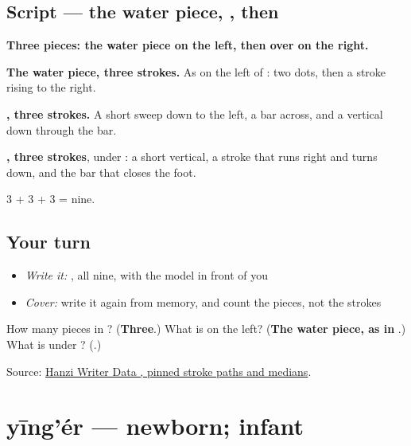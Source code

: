 \subsection*{Script — the water piece, , then }

\begin{quote}
\end{quote}

\textbf{Three pieces: the water piece on the left, then  over  on the right.}

\textbf{The water piece, three strokes.} As on the left of : two dots, then a stroke rising to the right.

\textbf{, three strokes.} A short sweep down to the left, a bar across, and a vertical down through the bar.

\textbf{, three strokes}, under : a short vertical, a stroke that runs right and turns down, and the bar that closes the foot.

3 + 3 + 3 = nine.

\subsection*{Your turn}
\begin{itemize}
\raggedright
  \item \emph{Write it:} , all nine, with the model in front of you
  \item \emph{Cover:} write it again from memory, and count the pieces, not the strokes
\end{itemize}

\begin{tcolorbox}[breakable,colback=teal!4,colframe=teal!35!black,title={Before you move on}]
How many pieces in ? (\textbf{Three}.) What is on the left? (\textbf{The water piece, as in }.) What is under ? (\textbf{}.)

Source: \href{https://raw.githubusercontent.com/chanind/hanzi-writer-data/68d10a4b21150cae5e1ebbd223eed289cf32d90c/data/\%E6\%B4\%BB.json}{Hanzi Writer Data , pinned stroke paths and medians}.
\end{tcolorbox}
\section[yīng'ér]{yīng'ér — newborn; infant}

